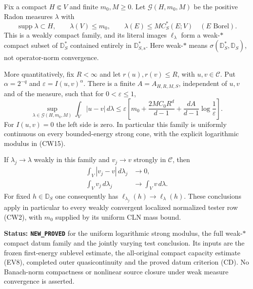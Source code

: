 \begin{theorem}
\label{thm:r12-compact-capacity-dual-equicontinuity}
Fix a compact $H\Subset V$ and finite $m_0,M\geq0$. Let
$\mathcal G(H,m_0,M)$ be the positive Radon measures $\lambda$
with
\[
 \operatorname{supp}\lambda\subset H,\qquad
 \lambda(V)\leq m_0,\qquad
 \lambda(E)\leq M C_S^*(E;V)\quad(E\text{ Borel}).
 \tag{CW14}
\]
This is a weakly compact family, and its literal images
$\ell_\lambda$ form a weak-$*$ compact subset of
$\mathbb D_S^*$ contained entirely in
$\mathbb D_{S,\mathrm s}^*$. Here weak-$*$ means
$\sigma(\mathbb D_S^*,\mathbb D_S)$, not operator-norm
convergence.

More quantitatively, fix $R<\infty$ and let
$r(u),r(v)\leq R$, with $u,v\in\mathscr C$. Put
$\alpha=2^{-q}$ and $\varepsilon=I(u,v)^\alpha$.
There is a finite $A=A_{H,R,M,S}$, independent of $u,v$
and of the measure, such that for $0<\varepsilon\leq1$,
\[
 \sup_{\lambda\in\mathcal G(H,m_0,M)}
       \int_V|u-v|\,d\lambda
 \leq\varepsilon\left[
        m_0+\frac{2MC_0R^d}{d-1}
             +\frac{dA}{d-1}\log\frac1\varepsilon\right].
 \tag{CW15}
\]
For $I(u,v)=0$ the left side is zero. In particular this
family is uniformly continuous on every bounded-energy
strong cone, with the explicit logarithmic modulus in (CW15).

If $\lambda_j\to\lambda$ weakly in this family and
$v_j\to v$ strongly in $\mathscr C$, then
\[
 \begin{split}
   \int_V|v_j-v|\,d\lambda_j&\longrightarrow0,\\
   \int_V v_j\,d\lambda_j&\longrightarrow\int_Vv\,d\lambda.
 \end{split}
 \tag{CW16}
\]
For fixed $h\in\mathbb D_S$ one consequently has
$\ell_{\lambda_j}(h)\to\ell_\lambda(h)$.
These conclusions apply in particular to every weakly
convergent localized normalized tester row (CW2), with
$m_0$ supplied by its uniform CLN mass bound.
\end{theorem}

\noindent\textbf{Status: \texttt{NEW\_PROVED}} for the
uniform logarithmic strong modulus, the full weak-$*$
compact datum family and the jointly varying test conclusion.
Its inputs are the frozen first-energy sublevel estimate,
the all-original compact capacity estimate (EV8), completed
outer quasicontinuity and the proved datum criterion (CD).
No Banach-norm compactness or nonlinear source closure under
weak measure convergence is asserted.


